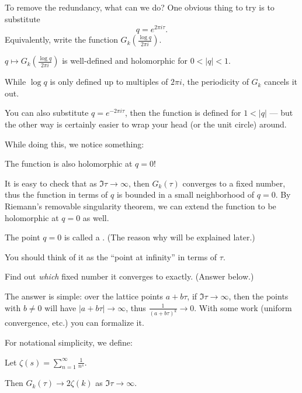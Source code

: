 To remove the redundancy, what can we do? One obvious thing to try is to substitute
\[ q = e^{2 \pi i \tau}. \]
Equivalently, write the function $G_k(\frac{\log q}{2 \pi i})$.


\begin{claim}
	$q \mapsto G_k(\frac{\log q}{2 \pi i})$ is well-defined and holomorphic for $0<|q|<1$.
\end{claim}
While $\log q$ is only defined up to multiples of $2 \pi i$, the periodicity of $G_k$ cancels it
out.

\begin{remark}
	You can also substitute $q = e^{-2 \pi i \tau}$, then the function is defined for $1<|q|$ ---
	but the other way is certainly easier to wrap your head (or the unit circle) around.
\end{remark}

While doing this, we notice something:
\begin{moral}
	The function is also holomorphic at $q=0$!
\end{moral}

It is easy to check that as $\Im \tau \to \infty$, then $G_k(\tau)$ converges to a fixed number,
thus the function in terms of $q$ is bounded in a small neighborhood of $q=0$.
By Riemann's removable singularity theorem,
we can extend the function to be holomorphic at $q=0$ as well.

The point $q=0$ is called a . (The reason why will be explained later.) 
\begin{moral}
	You should think of it as the ``point at infinity'' in terms of $\tau$.
\end{moral}

\begin{exercise}
	Find out \emph{which} fixed number it converges to exactly. (Answer below.)
\end{exercise}

The answer is simple: over the lattice points $a+b \tau$, if $\Im \tau \to \infty$, then the points
with $b \neq 0$ will have $|a+b \tau| \to \infty$, thus $\frac{1}{(a+b \tau)^k}\to 0$.
With some work (uniform convergence, etc.) you can formalize it.

For notational simplicity, we define:
\begin{definition}
	Let $\zeta(s) = \sum_{n=1}^\infty \frac{1}{n^s}$.
\end{definition}
Then $G_k(\tau) \to 2 \zeta(k)$ as $\Im \tau \to \infty$.

